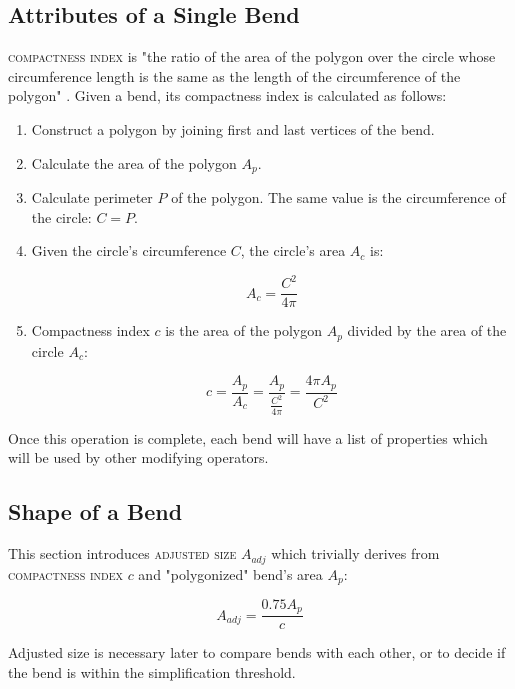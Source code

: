 \documentclass[a4paper]{article}
\begin{document}
\subsection{Attributes of a Single Bend}

\textsc{compactness index} is "the ratio of the area of the polygon over the
circle whose circumference length is the same as the length of the
circumference of the polygon" \cite{wang1998line}. Given a bend, its
compactness index is calculated as follows:

\begin{enumerate}

  \item Construct a polygon by joining first and last vertices of the bend.

  \item Calculate the area of the polygon $A_{p}$.

  \item Calculate perimeter $P$ of the polygon. The same value is the
      circumference of the circle: $C = P$.

    \item Given the circle's circumference $C$, the circle's area $A_{c}$ is:

    \[
      A_c = \frac{C^2}{4\pi}
    \]

  \item Compactness index $c$ is the area of the polygon $A_p$ divided by the
      area of the circle $A_c$:

    \[
      c = \frac{A_p}{A_c} =
          \frac{A_p}{ \frac{C^2}{4\pi} } =
          \frac{4\pi A_p}{C^2}
    \]

\end{enumerate}

Once this operation is complete, each bend will have a list of properties
which will be used by other modifying operators.

\subsection{Shape of a Bend}
\label{sec:shape-of-a-bend}

This section introduces \textsc{adjusted size} $A_{adj}$ which trivially
derives from \textsc{compactness index} $c$ and "polygonized" bend's area $A_{p}$:

\[
  A_{adj} = \frac{0.75 A_{p}}{c}
\]

Adjusted size is necessary later to compare bends with each other, or to decide if
the bend is within the simplification threshold.
\end{document}
